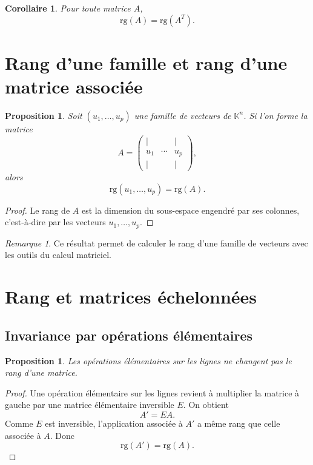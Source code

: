\documentclass[11pt,a4paper]{article}
\newtheorem{proposition}[definition]{Proposition}
\newtheorem{corollaire}[definition]{Corollaire}
\theoremstyle{remark}
\newtheorem{remarque}[definition]{Remarque}
\newcommand{\K}{\mathbb{K}}
\newcommand{\rg}{\mathrm{rg}}
\begin{document}
\begin{corollaire}
Pour toute matrice \(A\),
\[
\rg(A)=\rg(A^T).
\]
\end{corollaire}

\section{Rang d’une famille et rang d’une matrice associée}

\begin{proposition}
Soit \((u_1,\dots,u_p)\) une famille de vecteurs de \(\K^n\).  
Si l’on forme la matrice
\[
A=
\begin{pmatrix}
| & & |\\
u_1 & \cdots & u_p\\
| & & |
\end{pmatrix},
\]
alors
\[
\rg(u_1,\dots,u_p)=\rg(A).
\]
\end{proposition}

\begin{proof}
Le rang de \(A\) est la dimension du sous-espace engendré par ses colonnes, c’est-à-dire par les vecteurs \(u_1,\dots,u_p\).
\end{proof}

\begin{remarque}
Ce résultat permet de calculer le rang d’une famille de vecteurs avec les outils du calcul matriciel.
\end{remarque}

\section{Rang et matrices échelonnées}

\subsection{Invariance par opérations élémentaires}

\begin{proposition}
Les opérations élémentaires sur les lignes ne changent pas le rang d’une matrice.
\end{proposition}

\begin{proof}
Une opération élémentaire sur les lignes revient à multiplier la matrice à gauche par une matrice élémentaire inversible \(E\). On obtient
\[
A'=EA.
\]
Comme \(E\) est inversible, l’application associée à \(A'\) a même rang que celle associée à \(A\). Donc
\[
\rg(A')=\rg(A).
\]
\end{proof}
\end{document}
